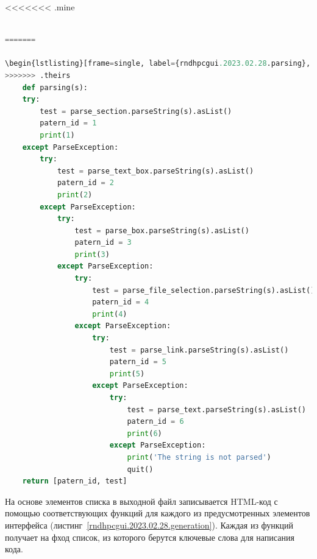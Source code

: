 <<<<<<< .mine
\begin{lstlisting}[frame=single, label={rndhpcgui.2023.02.28.parsing}, caption={Функция parsing}, language={Python}]

=======

\begin{lstlisting}[frame=single, label={rndhpcgui.2023.02.28.parsing}, caption={Функция parsing}, language={Python}] 
>>>>>>> .theirs
	def parsing(s):
    try:
        test = parse_section.parseString(s).asList()
        patern_id = 1
        print(1)
    except ParseException:
        try:
            test = parse_text_box.parseString(s).asList()
            patern_id = 2
            print(2)
        except ParseException:
            try:
                test = parse_box.parseString(s).asList()
                patern_id = 3
                print(3)
            except ParseException:
                try:
                    test = parse_file_selection.parseString(s).asList()
                    patern_id = 4
                    print(4)
                except ParseException:
                    try:
                        test = parse_link.parseString(s).asList()
                        patern_id = 5
                        print(5)
                    except ParseException:
                        try:
                            test = parse_text.parseString(s).asList()
                            patern_id = 6
                            print(6)
                        except ParseException:
                            print('The string is not parsed')
                            quit()
    return [patern_id, test]
\end{lstlisting}


На основе элементов списка в выходной файл записывается HTML-код с помощью соответствующих функций для каждого из предусмотренных элементов интерфейса (листинг~\ref{rndhpcgui.2023.02.28.generation}). Каждая из функций получает на фход список, из которого берутся ключевые слова для написания кода.


